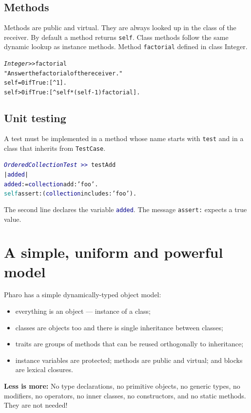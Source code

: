 \documentclass[notumble]{leaflet}
\makeatletter
\newcommand{\ct}[1]{{\textsf{#1}}\xspace}
\newenvironment{displaycode}{%
     \par
     \hspace{1.5em}\begin{minipage}{\linewidth}
       \begin{alltt}\small}{
       \end{alltt}
     \end{minipage}
     \par}
\newcommand{\code}[1]{\foreignlanguage{english}{\texttt{#1}}}
\makeatother
\begin{document}
\vspace{-0.3cm}
\subsection{Methods}
Methods are public and virtual. They are always looked up in the class of the receiver. By default a method returns \code{self}. 
Class methods follow the same dynamic lookup as instance methods. 
Method \code{factorial} defined in class \ct{Integer}. 

\begin{displaycode}
\textit{Integer >>} factorial
   "Answer the factorial of the receiver."
   self = 0 ifTrue: [^ 1].
   self > 0 ifTrue: [^ self * (self - 1) factorial].
\end{displaycode}



\vspace{-0.3cm}
\subsection{Unit testing}
A test must be implemented in a method whose name starts with \code{test} and in a class that
inherits from \code{TestCase}.

\begin{displaycode}
\textcolor{darkBlue}{\textit{OrderedCollectionTest}\,>>}\,testAdd
  | \textcolor{darkBlue}{added} |
  \textcolor{darkBlue}{added} := \textcolor{darkBlue}{collection} add: \textcolor{string}{'foo'}.
  \textcolor{darkCyan}{self} assert: (\textcolor{darkBlue}{collection} includes: \textcolor{string}{'foo'}).
\end{displaycode}

The second line declares the variable \code{\textcolor{darkBlue}{added}}. The message \code{assert:} expects a true value.
\vspace{-0.3cm}
\section{A simple, uniform and powerful model}

Pharo has a simple dynamically-typed object model:
\begin{itemize}
\item everything is an object --- instance of a class;
\item classes are objects too and there is single inheritance between classes;
\item traits are groups of methods that can be reused orthogonally to inheritance;
\item instance variables are protected; methods are public and virtual;
and blocks are lexical closures.
\end{itemize}

\textbf{Less is more:}  No type declarations, no primitive
objects, no generic types, no modifiers, no operators, no inner
classes, no constructors, and no static methods. They are not needed!



\end{document}

